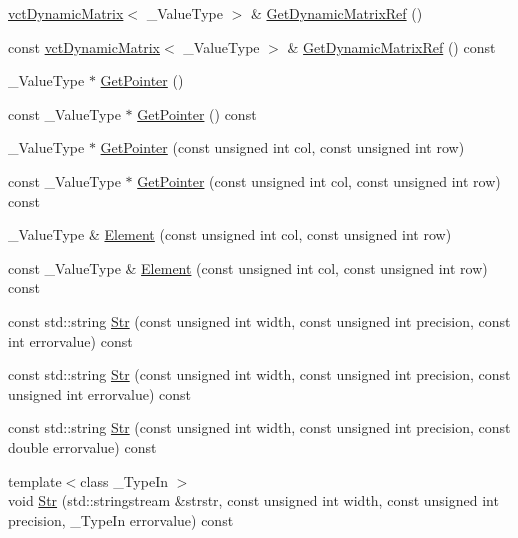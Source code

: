 \begin{DoxyCompactItemize}
\item 
\hyperlink{classvct_dynamic_matrix}{vct\+Dynamic\+Matrix}$<$ \+\_\+\+Value\+Type $>$ \& \hyperlink{classsvl_sample_matrix_custom_a931c6e5ecf6c236183db0c50b9fc9eeb}{Get\+Dynamic\+Matrix\+Ref} ()
\item 
const \hyperlink{classvct_dynamic_matrix}{vct\+Dynamic\+Matrix}$<$ \+\_\+\+Value\+Type $>$ \& \hyperlink{classsvl_sample_matrix_custom_ab653c3058872d3d6cdcaf65289fd1f5a}{Get\+Dynamic\+Matrix\+Ref} () const 
\item 
\+\_\+\+Value\+Type $\ast$ \hyperlink{classsvl_sample_matrix_custom_ae7b2387e839887ad890a5a97561deb3e}{Get\+Pointer} ()
\item 
const \+\_\+\+Value\+Type $\ast$ \hyperlink{classsvl_sample_matrix_custom_aea354a7c07e437320ba0f78eeaa32252}{Get\+Pointer} () const 
\item 
\+\_\+\+Value\+Type $\ast$ \hyperlink{classsvl_sample_matrix_custom_a76995c7d9701b923e01edac9414fc845}{Get\+Pointer} (const unsigned int col, const unsigned int row)
\item 
const \+\_\+\+Value\+Type $\ast$ \hyperlink{classsvl_sample_matrix_custom_a8eec5ee73879088ef94a68efe98ee86c}{Get\+Pointer} (const unsigned int col, const unsigned int row) const 
\item 
\+\_\+\+Value\+Type \& \hyperlink{classsvl_sample_matrix_custom_a122f12d641296f5368e82626ac512413}{Element} (const unsigned int col, const unsigned int row)
\item 
const \+\_\+\+Value\+Type \& \hyperlink{classsvl_sample_matrix_custom_a8334de003529b5b0c89de4c2570fb1a5}{Element} (const unsigned int col, const unsigned int row) const 
\item 
const std\+::string \hyperlink{classsvl_sample_matrix_custom_a3e72c267925ae2bc75f1cfabb9266992}{Str} (const unsigned int width, const unsigned int precision, const int errorvalue) const 
\item 
const std\+::string \hyperlink{classsvl_sample_matrix_custom_ab4980a4cb574effea33455a7b293baf8}{Str} (const unsigned int width, const unsigned int precision, const unsigned int errorvalue) const 
\item 
const std\+::string \hyperlink{classsvl_sample_matrix_custom_ab3ce32f3a3bfbf20239a05cb0b70acf9}{Str} (const unsigned int width, const unsigned int precision, const double errorvalue) const 
\item 
{\footnotesize template$<$class \+\_\+\+Type\+In $>$ }\\void \hyperlink{classsvl_sample_matrix_custom_a1b061c3c6ef61dc97b2dc5ee0363c3d4}{Str} (std\+::stringstream \&strstr, const unsigned int width, const unsigned int precision, \+\_\+\+Type\+In errorvalue) const 
\end{DoxyCompactItemize}

